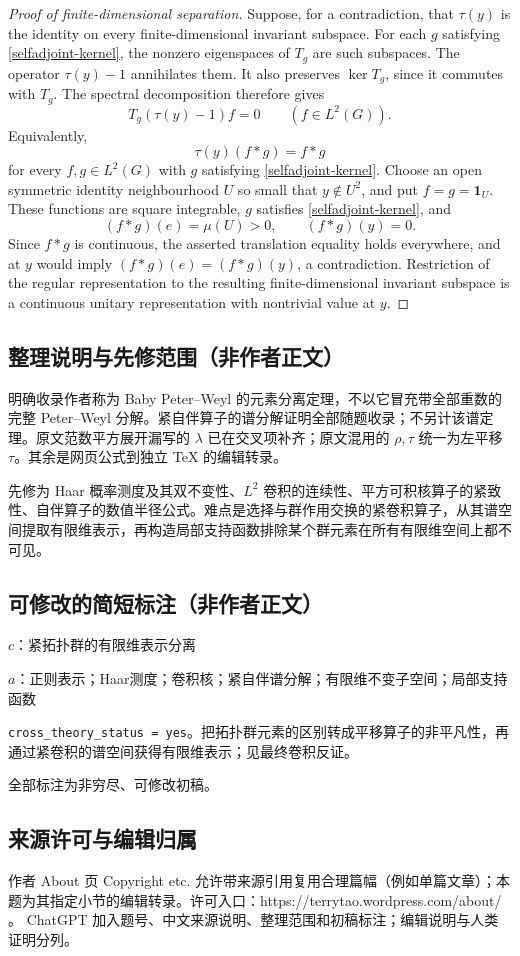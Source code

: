 \documentclass[UTF8,11pt]{ctexart}
\theoremstyle{definition}
\begin{document}
\begin{proof}[Proof of finite-dimensional separation]
Suppose, for a contradiction, that $\tau(y)$ is the identity on every
finite-dimensional invariant subspace. For each $g$ satisfying
\eqref{selfadjoint-kernel}, the nonzero eigenspaces of $T_g$ are such
subspaces. The operator $\tau(y)-1$ annihilates them. It also preserves
$\ker T_g$, since it commutes with $T_g$. The spectral decomposition
therefore gives
\[
 T_g(\tau(y)-1)f=0\qquad(f\in L^2(G)).
\]
Equivalently,
\[
 \tau(y)(f*g)=f*g
\]
for every $f,g\in L^2(G)$ with $g$ satisfying \eqref{selfadjoint-kernel}.
Choose an open symmetric identity neighbourhood $U$ so small that
$y\notin U^2$, and put $f=g=\mathbf1_U$. These functions are square
integrable, $g$ satisfies \eqref{selfadjoint-kernel}, and
\[
 (f*g)(e)=\mu(U)>0,\qquad (f*g)(y)=0.
\]
Since $f*g$ is continuous, the asserted translation equality holds
everywhere, and at $y$ would imply $(f*g)(e)=(f*g)(y)$, a contradiction.
Restriction of the regular representation to the resulting
finite-dimensional invariant subspace is a continuous unitary
representation with nontrivial value at $y$.
\end{proof}

\subsection*{整理说明与先修范围（非作者正文）}
明确收录作者称为 Baby Peter--Weyl 的元素分离定理，不以它冒充带全部重数的完整 Peter--Weyl 分解。紧自伴算子的谱分解证明全部随题收录；不另计该谱定理。原文范数平方展开漏写的 $\lambda$ 已在交叉项补齐；原文混用的 $\rho,\tau$ 统一为左平移 $\tau$。其余是网页公式到独立 TeX 的编辑转录。

先修为 Haar 概率测度及其双不变性、$L^2$ 卷积的连续性、平方可积核算子的紧致性、自伴算子的数值半径公式。难点是选择与群作用交换的紧卷积算子，从其谱空间提取有限维表示，再构造局部支持函数排除某个群元素在所有有限维空间上都不可见。
\subsection*{可修改的简短标注（非作者正文）}
$c$：紧拓扑群的有限维表示分离

$a$：正则表示；Haar测度；卷积核；紧自伴谱分解；有限维不变子空间；局部支持函数

\texttt{cross\_theory\_status = yes}。把拓扑群元素的区别转成平移算子的非平凡性，再通过紧卷积的谱空间获得有限维表示；见最终卷积反证。

全部标注为非穷尽、可修改初稿。
\subsection*{来源许可与编辑归属}
作者 About 页 Copyright etc. 允许带来源引用复用合理篇幅（例如单篇文章）；本题为其指定小节的编辑转录。许可入口：https://terrytao.wordpress.com/about/ 。
ChatGPT 加入题号、中文来源说明、整理范围和初稿标注；编辑说明与人类证明分列。
\end{document}
